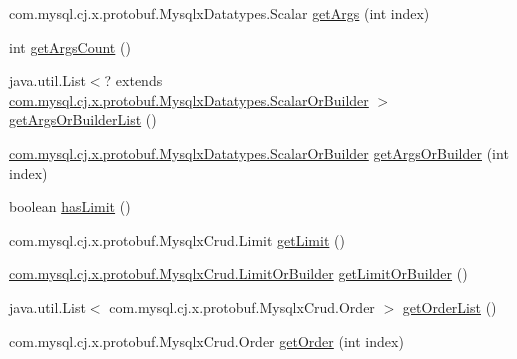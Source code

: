 \begin{DoxyCompactItemize}
\item 
com.\+mysql.\+cj.\+x.\+protobuf.\+Mysqlx\+Datatypes.\+Scalar \mbox{\hyperlink{interfacecom_1_1mysql_1_1cj_1_1x_1_1protobuf_1_1_mysqlx_crud_1_1_delete_or_builder_af94a9cf2b608beb4d44cd9bc0a5bea65}{get\+Args}} (int index)
\item 
int \mbox{\hyperlink{interfacecom_1_1mysql_1_1cj_1_1x_1_1protobuf_1_1_mysqlx_crud_1_1_delete_or_builder_ad236bae0dbe9ac9fb63f0c56da7d21dc}{get\+Args\+Count}} ()
\item 
java.\+util.\+List$<$? extends \mbox{\hyperlink{interfacecom_1_1mysql_1_1cj_1_1x_1_1protobuf_1_1_mysqlx_datatypes_1_1_scalar_or_builder}{com.\+mysql.\+cj.\+x.\+protobuf.\+Mysqlx\+Datatypes.\+Scalar\+Or\+Builder}} $>$ \mbox{\hyperlink{interfacecom_1_1mysql_1_1cj_1_1x_1_1protobuf_1_1_mysqlx_crud_1_1_delete_or_builder_a25748d33fcd88be88fcba03c8df4e84f}{get\+Args\+Or\+Builder\+List}} ()
\item 
\mbox{\hyperlink{interfacecom_1_1mysql_1_1cj_1_1x_1_1protobuf_1_1_mysqlx_datatypes_1_1_scalar_or_builder}{com.\+mysql.\+cj.\+x.\+protobuf.\+Mysqlx\+Datatypes.\+Scalar\+Or\+Builder}} \mbox{\hyperlink{interfacecom_1_1mysql_1_1cj_1_1x_1_1protobuf_1_1_mysqlx_crud_1_1_delete_or_builder_a64cc3fcbd2a10bf76692e7fc63c20067}{get\+Args\+Or\+Builder}} (int index)
\item 
boolean \mbox{\hyperlink{interfacecom_1_1mysql_1_1cj_1_1x_1_1protobuf_1_1_mysqlx_crud_1_1_delete_or_builder_a82f69ce695a95c01cd0217f0bd8eb6e6}{has\+Limit}} ()
\item 
com.\+mysql.\+cj.\+x.\+protobuf.\+Mysqlx\+Crud.\+Limit \mbox{\hyperlink{interfacecom_1_1mysql_1_1cj_1_1x_1_1protobuf_1_1_mysqlx_crud_1_1_delete_or_builder_af5e79c60abb0e8d562ee4b1ac49c4cce}{get\+Limit}} ()
\item 
\mbox{\hyperlink{interfacecom_1_1mysql_1_1cj_1_1x_1_1protobuf_1_1_mysqlx_crud_1_1_limit_or_builder}{com.\+mysql.\+cj.\+x.\+protobuf.\+Mysqlx\+Crud.\+Limit\+Or\+Builder}} \mbox{\hyperlink{interfacecom_1_1mysql_1_1cj_1_1x_1_1protobuf_1_1_mysqlx_crud_1_1_delete_or_builder_a507e9bb8133082165aa231d2f2e96b2b}{get\+Limit\+Or\+Builder}} ()
\item 
java.\+util.\+List$<$ com.\+mysql.\+cj.\+x.\+protobuf.\+Mysqlx\+Crud.\+Order $>$ \mbox{\hyperlink{interfacecom_1_1mysql_1_1cj_1_1x_1_1protobuf_1_1_mysqlx_crud_1_1_delete_or_builder_a168912d3276c590fbaa53d58759359cb}{get\+Order\+List}} ()
\item 
com.\+mysql.\+cj.\+x.\+protobuf.\+Mysqlx\+Crud.\+Order \mbox{\hyperlink{interfacecom_1_1mysql_1_1cj_1_1x_1_1protobuf_1_1_mysqlx_crud_1_1_delete_or_builder_aa0241edd37e2d0666c4768c3cb3326e7}{get\+Order}} (int index)

\end{DoxyCompactItemize}
